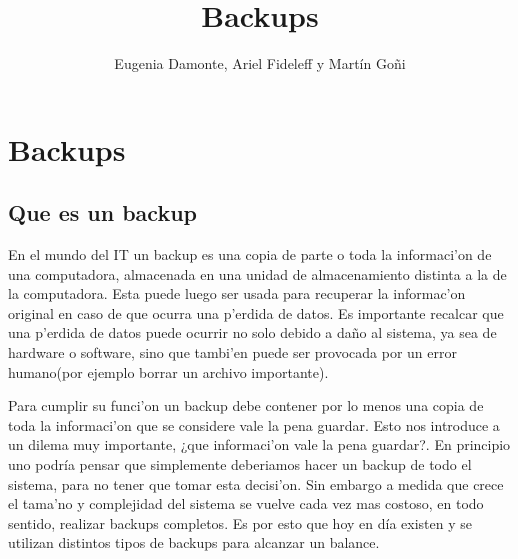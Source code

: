 \documentclass[11pt]{article}
\title{\Huge Backups}
\author{Eugenia Damonte, Ariel Fideleff y Mart\'in Go\~ni}
\date{}
\begin{document}
	\maketitle
	\newpage
	\tableofcontents
	\newpage

	
	\section{Backups}
	\subsection{Que es un backup}
		En el mundo del IT un backup es una copia de parte o toda la informaci'on de una computadora, almacenada en una unidad de almacenamiento distinta a la de la computadora. Esta puede luego ser usada para recuperar la informac'on original en caso de que ocurra una p'erdida de datos. Es importante recalcar que una p'erdida de datos puede ocurrir no solo debido a daño al sistema, ya sea de hardware o software, sino que tambi'en puede ser provocada por un error humano(por ejemplo borrar un archivo importante).

		Para cumplir su funci'on un backup debe contener por lo menos una copia de toda la informaci'on que se considere vale la pena guardar. Esto nos introduce a un dilema muy importante, ¿que informaci'on vale la pena guardar?. En principio uno podría pensar que simplemente deberiamos hacer un backup de todo el sistema, para no tener que tomar esta decisi'on. Sin embargo a medida que crece el tama'no y complejidad del sistema se vuelve cada vez mas costoso, en todo sentido, realizar backups completos. Es por esto que hoy en día existen y se utilizan distintos tipos de backups para alcanzar un balance.
\end{document}
